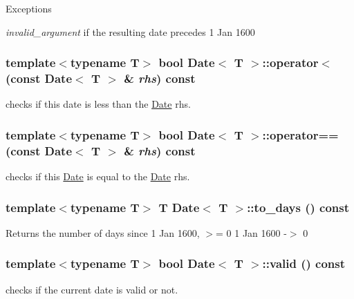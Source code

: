 \begin{DoxyExceptions}{Exceptions}
\item[{\em invalid\_\-argument}]if the resulting date precedes 1 Jan 1600 \end{DoxyExceptions}
\hypertarget{classDate_ac633cf922af2965d5f22a229c0a51390}{
\subsubsection[{operator$<$}]{\setlength{\rightskip}{0pt plus 5cm}template$<$typename T$>$ bool {\bf Date}$<$ T $>$::operator$<$ (const {\bf Date}$<$ T $>$ \& {\em rhs}) const}}
\label{classDate_ac633cf922af2965d5f22a229c0a51390}
checks if this date is less than the \hyperlink{classDate}{Date} rhs. \hypertarget{classDate_a008a69648c7fa5998d2c5e712b73e6f3}{
\subsubsection[{operator==}]{\setlength{\rightskip}{0pt plus 5cm}template$<$typename T$>$ bool {\bf Date}$<$ T $>$::operator== (const {\bf Date}$<$ T $>$ \& {\em rhs}) const}}
\label{classDate_a008a69648c7fa5998d2c5e712b73e6f3}
checks if this \hyperlink{classDate}{Date} is equal to the \hyperlink{classDate}{Date} rhs. \hypertarget{classDate_a64620fd3e81930d15c7f9bc48ed4b92e}{
\subsubsection[{to\_\-days}]{\setlength{\rightskip}{0pt plus 5cm}template$<$typename T$>$ T {\bf Date}$<$ T $>$::to\_\-days () const}}
\label{classDate_a64620fd3e81930d15c7f9bc48ed4b92e}
\begin{DoxyReturn}{Returns}
the number of days since 1 Jan 1600, $>$= 0 1 Jan 1600 -\/$>$ 0 
\end{DoxyReturn}
\hypertarget{classDate_abbb19de27d20c0e91798ebc77636acc1}{
\subsubsection[{valid}]{\setlength{\rightskip}{0pt plus 5cm}template$<$typename T$>$ bool {\bf Date}$<$ T $>$::valid () const}}
\label{classDate_abbb19de27d20c0e91798ebc77636acc1}
checks if the current date is valid or not. 

